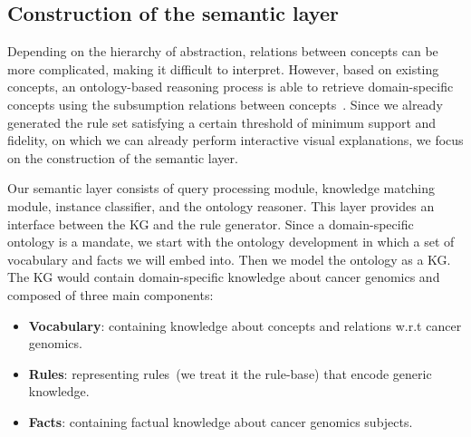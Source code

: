 \subsection{Construction of the semantic layer}
Depending on the hierarchy of abstraction, relations between concepts can be more complicated, making it difficult to interpret. However, based on existing concepts, an ontology-based reasoning process is able to retrieve  domain-specific concepts using the subsumption relations between concepts~\cite{alirezaie2019semantic}. Since we already generated the rule set satisfying a certain threshold of minimum support and fidelity, on which we can already perform interactive visual explanations, we focus on the construction of the semantic layer. 

\hspace*{3.5mm} Our semantic layer consists of query processing module, knowledge matching module, instance classifier, and the ontology reasoner. This layer provides an interface between the KG and the rule generator. Since a domain-specific ontology is a mandate, we start with the ontology development in which a set of vocabulary and facts we will embed into. Then we model the ontology as a KG. The KG would contain domain-specific knowledge about cancer genomics and composed of three main components:

\vspace{-2mm}
\begin{itemize}[noitemsep]
    \item \textbf{Vocabulary}: containing knowledge about concepts and relations w.r.t cancer genomics. 
    \item \textbf{Rules}: representing rules~(we treat it the rule-base) that encode generic knowledge. 
    \item \textbf{Facts}: containing factual knowledge about cancer genomics subjects.
    \vspace{-4mm}
\end{itemize}

